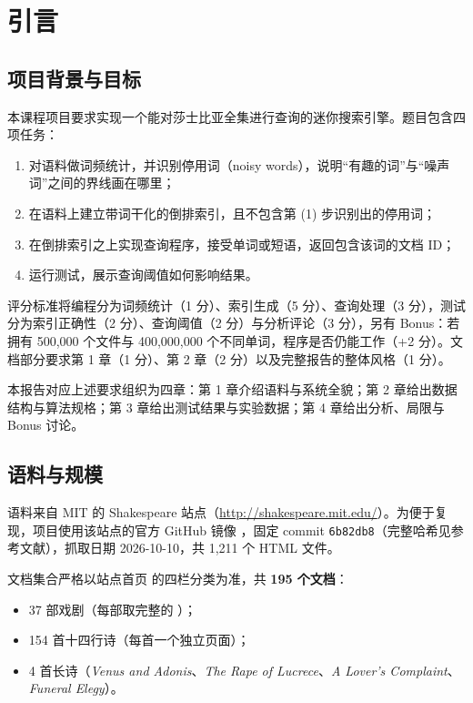 \chapter{引言}\label{ch:intro}

\section{项目背景与目标}

本课程项目要求实现一个能对莎士比亚全集进行查询的迷你搜索引擎。题目包含四项任务：

\begin{enumerate}
  \item 对语料做词频统计，并识别停用词（noisy words），说明“有趣的词”与“噪声词”之间的界线画在哪里；
  \item 在语料上建立带词干化的倒排索引，且不包含第 (1) 步识别出的停用词；
  \item 在倒排索引之上实现查询程序，接受单词或短语，返回包含该词的文档 ID；
  \item 运行测试，展示查询阈值如何影响结果。
\end{enumerate}

评分标准将编程分为词频统计（1 分）、索引生成（5 分）、查询处理（3 分），测试分为索引正确性（2 分）、查询阈值（2 分）与分析评论（3 分），另有 Bonus：若拥有 500,000 个文件与 400,000,000 个不同单词，程序是否仍能工作（+2 分）。文档部分要求第 1 章（1 分）、第 2 章（2 分）以及完整报告的整体风格（1 分）。

本报告对应上述要求组织为四章：第 1 章介绍语料与系统全貌；第 2 章给出数据结构与算法规格；第 3 章给出测试结果与实验数据；第 4 章给出分析、局限与 Bonus 讨论。

\section{语料与规模}

语料来自 MIT 的 Shakespeare 站点（\url{http://shakespeare.mit.edu/}）。为便于复现，项目使用该站点的官方 GitHub 镜像 ，固定 commit \texttt{6b82db8}（完整哈希见参考文献），抓取日期 2026-10-10，共 1,211 个 HTML 文件。

文档集合严格以站点首页  的四栏分类为准，共 \textbf{195 个文档}：

\begin{itemize}
  \item 37 部戏剧（每部取完整的 ）；
  \item 154 首十四行诗（每首一个独立页面）；
  \item 4 首长诗（\emph{Venus and Adonis}、\emph{The Rape of Lucrece}、\emph{A Lover's Complaint}、\emph{Funeral Elegy}）。
\end{itemize}

